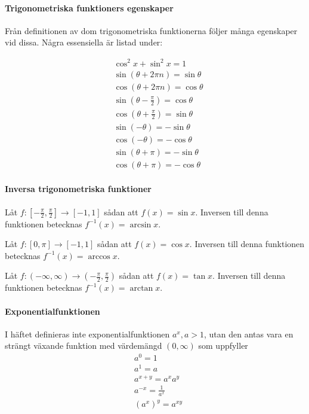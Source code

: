 \paragraph{Trigonometriska funktioners egenskaper}

Från definitionen av dom trigonometriska funktionerna följer många egenskaper vid dissa. Några essensiella är listad under:

\begin{align*}
	&\cos^2x + \sin^2x = 1\\
	&\sin\left(\theta + 2\pi n\right) = \sin\theta\\
	&\cos\left(\theta + 2\pi n\right) = \cos\theta\\
	&\sin\left(\theta - \frac{\pi}{2}\right) = \cos\theta\\
	&\cos\left(\theta + \frac{\pi}{2}\right) = \sin\theta\\
	&\sin\left(-\theta\right) = -\sin\theta\\
	&\cos\left(-\theta\right) = -\cos\theta\\
	&\sin\left(\theta+\pi\right) = -\sin\theta\\
	&\cos\left(\theta+\pi\right) = -\cos\theta
\end{align*}

\paragraph{Inversa trigonometriska funktioner}

Låt $f:\left[-\frac{\pi}{2},\frac{\pi}{2}\right]\to [-1,1]$ sådan att $f(x)=\sin x$. Inversen till denna funktionen betecknas $f^{-1}(x)=\arcsin x$.

Låt $f:[0,\pi]\to [-1,1]$ sådan att $f(x)=\cos x$. Inversen till denna funktionen betecknas $f^{-1}(x)=\arccos x$.

Låt $f:(-\infty,\infty)\to \left(-\frac{\pi}{2},\frac{\pi}{2}\right)$ sådan att $f(x)=\tan x$. Inversen till denna funktionen betecknas $f^{-1}(x)=\arctan x$.

\paragraph{Exponentialfunktionen}

I häftet definieras inte exponentialfunktionen $a^x, a>1$, utan den antas vara en strängt växande funktion med värdemängd $(0,\infty)$ som uppfyller
\begin{align*}
	&a^0 = 1\\
	&a^1 = a\\
	&a^{x + y} = a^x a^y\\
	&a^{-x} = \frac{1}{a^x}\\
	&\left(a^x\right)^y = a^{xy}
\end{align*}

